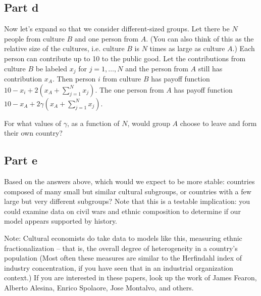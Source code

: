 \documentclass[10pt]{article}
\begin{document}
\newpage

\subsection*{Part d} Now let's expand so that we consider different-sized groups. Let there be $N$ people from culture $B$ and one person from $A$. (You can also think of this as the relative size of the cultures, i.e. culture $B$ is $N$ times as large as culture $A$.) Each person can contribute up to 10 to the public good. Let the contributions from culture $B$ be labeled $x_j$ for $j=1,\ldots,N$ and the person from $A$ still has contribution $x_A$. Then person $i$ from culture $B$ has payoff function $10-x_i+2\left(x_A+\sum_{j=1}^{N}x_j\right)$. The one person from $A$ has payoff function $10-x_A+2\gamma\left(x_A+\sum_{j=1}^{N}x_j\right)$.

For what values of $\gamma$, as a function of $N$, would group $A$ choose to leave and form their own country?

\newpage

\subsection*{Part e} Based on the answers above, which would we expect to be more stable: countries composed of many small but similar cultural subgroups, or countries with a few large but very different subgroups? Note that this is a testable implication: you could examine data on civil wars and ethnic composition to determine if our model appears supported by history.

Note: Cultural economists do take data to models like this, measuring ethnic fractionalization -- that is, the overall degree of heterogeneity in a country's population (Most often these measures are similar to the Herfindahl index of industry concentration, if you have seen that in an industrial organization context.) If you are interested in these papers, look up the work of James Fearon, Alberto Alesina, Enrico Spolaore, Jose Montalvo, and others. 
\end{document}
